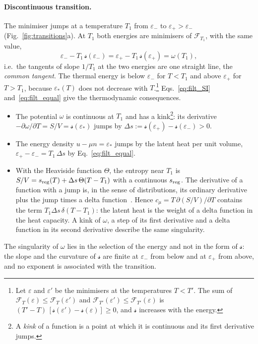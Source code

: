\documentclass[10pt,a4paper]{article}
\theoremstyle{plain}
\newcommand{\Fen}[1][T]{\mathscr{F}_{#1}}  %
\newcommand{\lds}{\mathscr{s}}  %
\begin{document}
\paragraph{Discontinuous transition.} The minimiser jumps at a temperature
$T_1$ from $\varepsilon_-$ to $\varepsilon_+>\varepsilon_-$
(Fig.~\ref{fig:transitions}a). At $T_1$ both energies are minimisers of
$\Fen[T_1]$, with the same value,
\begin{equation}\label{eq:filt_equal}
  \varepsilon_--T_1\,\lds(\varepsilon_-)=\varepsilon_+-T_1\,\lds(\varepsilon_+)=\omega(T_1) ,
\end{equation}
i.e.\ the tangents of slope $1/T_1$ at the two energies are one straight
line, the \emph{common tangent}. The thermal energy is below
$\varepsilon_-$ for $T<T_1$ and above $\varepsilon_+$ for $T>T_1$, because
$\varepsilon_*(T)$ does not decrease with $T$.\footnote{Let $\varepsilon$ and
$\varepsilon'$ be the minimisers at the temperatures $T<T'$. The sum of
$\Fen[T](\varepsilon)\le\Fen[T](\varepsilon')$ and
$\Fen[T'](\varepsilon')\le\Fen[T'](\varepsilon)$ is
$(T'-T)\,[\lds(\varepsilon')-\lds(\varepsilon)]\ge0$, and $\lds$ increases
with the energy.}
Eqs.~\eqref{eq:filt_SI} and~\eqref{eq:filt_equal} give
the thermodynamic consequences.
\begin{itemize}\setlength{\itemsep}{0pt}
\item The potential $\omega$ is continuous at $T_1$ and has a
  kink\footnote{A \emph{kink} of a function is a point at which it is
  continuous and its first derivative jumps.}: its derivative
  $-\partial\omega/\partial T=S/V=\lds(\varepsilon_*)$ jumps by
  $\Delta s:=\lds(\varepsilon_+)-\lds(\varepsilon_-)>0$.
\item The energy density $u-\mu n=\varepsilon_*$ jumps by the latent heat
  per unit volume, $\varepsilon_+-\varepsilon_-=T_1\,\Delta s$ by
  Eq.~\eqref{eq:filt_equal}.
\item With the Heaviside function $\Theta$, the entropy near $T_1$ is
  $S/V=s_{\rm reg}(T)+\Delta s\,\Theta(T-T_1)$ with a continuous
  $s_{\rm reg}$. The derivative of a function with a jump is, in the sense
  of distributions, its ordinary derivative plus the jump times a delta
  function~\cite[Theorem~7.47]{Appel2007}. Hence
  $c_\mu=T\,\partial(S/V)/\partial T$ contains the term
  $T_1\Delta s\,\delta(T-T_1)$: the latent heat is the weight of a delta
  function in the heat capacity. A kink of $\omega$, a step of its first
  derivative and a delta function in its second derivative describe the
  same singularity.
\end{itemize}
The singularity of $\omega$ lies in the selection of the energy and not in
the form of $\lds$: the slope and the curvature of $\lds$ are finite at
$\varepsilon_-$ from below and at $\varepsilon_+$ from above, and no exponent
is associated with the transition.
\end{document}
